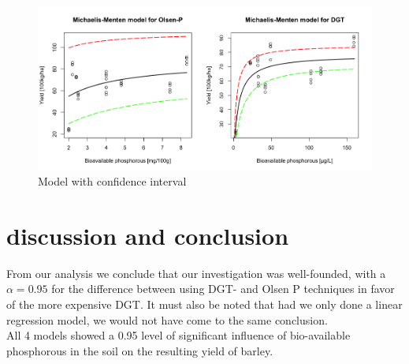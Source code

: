 \documentclass{article}
\begin{document}
\begin{figure}[H]
	\includegraphics[width=\linewidth]{modelsEnv.png}
	\caption{Model with confidence interval}
	\label{fig:modelCI}
\end{figure}



\section{discussion and conclusion}

From our analysis we conclude that our investigation was well-founded, with a $\alpha = 0.95$ for the difference between using DGT- and Olsen P techniques in favor of the more expensive DGT. It  must also be noted that had we only done a linear regression model, we would not have come to the same conclusion. \\ All 4 models showed a 0.95 level of significant influence of bio-available phosphorous in the soil on the resulting yield of barley.
\end{document}

